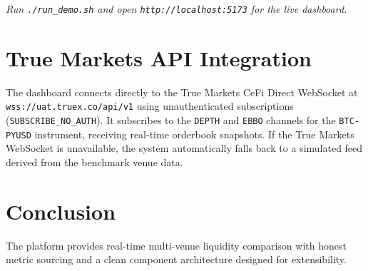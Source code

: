 \documentclass[10pt]{article}
\begin{document}
\vspace{10pt}

\begin{tcolorbox}[colback=tmblue!5, colframe=tmblue, title=Live Console Demo]
    \centering
    \textit{Run \texttt{./run\_demo.sh} and open \texttt{http://localhost:5173} for the live dashboard.}
\end{tcolorbox}

\section{True Markets API Integration}
The dashboard connects directly to the True Markets CeFi Direct WebSocket at \texttt{wss://uat.truex.co/api/v1} using unauthenticated subscriptions (\texttt{SUBSCRIBE\_NO\_AUTH}). It subscribes to the \texttt{DEPTH} and \texttt{EBBO} channels for the \texttt{BTC-PYUSD} instrument, receiving real-time orderbook snapshots. If the True Markets WebSocket is unavailable, the system automatically falls back to a simulated feed derived from the benchmark venue data.

\section{Conclusion}
The platform provides real-time multi-venue liquidity comparison with honest metric sourcing and a clean component architecture designed for extensibility.
\end{document}
